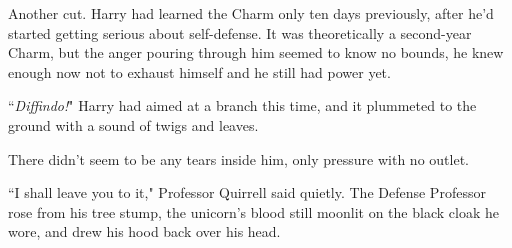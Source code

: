 Another cut. Harry had learned the Charm only ten days previously, after he'd started getting serious about self-defense. It was theoretically a second-year Charm, but the anger pouring through him seemed to know no bounds, he knew enough now not to exhaust himself and he still had power yet.

``\emph{Diffindo!}" Harry had aimed at a branch this time, and it plummeted to the ground with a sound of twigs and leaves.

There didn't seem to be any tears inside him, only pressure with no outlet.

``I shall leave you to it," Professor Quirrell said quietly. The Defense Professor rose from his tree stump, the unicorn's blood still moonlit on the black cloak he wore, and drew his hood back over his head.

